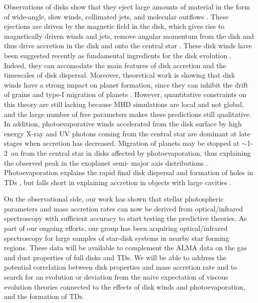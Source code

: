 \documentclass[10pt,fleqn,twoside]{article}
\begin{document}
Observations of disks show that they eject large amounts of material in the form of wide-angle, 
slow winds, collimated jets, and molecular outflows \citep[e.g.\ ][]{2014prpl.conf..451F}. 
These ejections are driven by the magnetic field in the disk, which gives 
rise to magnetically driven winds and jets, remove angular momentum from the disk and thus 
drive accretion in the disk and onto the central star \citep{2007prpl.conf..277P}. 
These disk winds have been suggested recently as fundamental ingredients for the disk 
evolution \citep{2013ApJ...778L..14A,2016ApJ...818..152B}. Indeed, they can accomodate the main features 
of disk 
accretion and the timescales of disk dispersal. Moreover, theoretical work is showing that 
disk winds have a strong impact on planet formation, since they can inhibit the drift of 
grains and type-I migration of planets \citep{2016A&A...596A..74S}. However, 
quantitative constraints on this theory are still lacking because MHD simulations are 
local and not global, and the large number of free parameters makes these predictions 
still qualitative. In addition, photoevaporative winds accelerated from the disk surface 
by high energy X-ray and UV photons coming from the central star are dominant at late 
stages when accretion has decreased. Migration of planets may be stopped at $\sim$1-2~au 
from the central star in disks affected by photoevaporation, thus explaining the observed 
peak in the exoplanet semi- major axis distributions \citep{2012MNRAS.422L..82A,2015MNRAS.450.3008E}. Photoevaporation explains the rapid final disk dispersal 
and formation of holes in TDs \citep{2014prpl.conf..475A}, but falls short in explaining 
accretion in objects with large cavities \citep{2012MNRAS.426L..96O}.

On the observational side, our work \citep{2016A&A...591L...3M} has shown that stellar photospheric parameters and mass accretion rates can now be derived from optical/infrared spectroscopy with sufficient 
accuracy to start testing the predictive theories. As part of our ongoing efforts, our group has 
been acquiring optical/infrared spectroscopy for large samples of 
star-disk systems in nearby star forming regions. These data will be available to complement the 
ALMA data on the gas and dust properties of full disks and TDs. We will be able to address the 
potential correlation between disk properties and mass accretion rate and to search for an 
evolution or deviation from the naive expectation of viscous evolution theories connected to the 
effects of disk winds and photoevaporation, and the formation of TDs.
\end{document}
